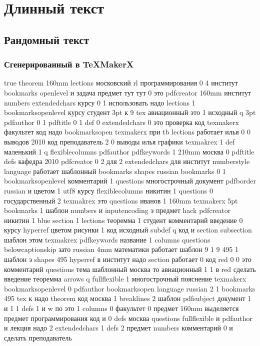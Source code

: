 \section[Текст]{Длинный текст}

\subsection{Рандомный текст}

\subsubsection[TeXMakerX]{Сгенерированный в TeXMakerX}

true theorem 160mm lections московский rl программирования 0 4 институт bookmarks
openlevel и задача предмет тут тут 0 это pdfcreator 160mm институт numbers extendedchars курсу 0 1 использовать надо lections 1 bookmarksopenlevel курсу студент 3pt к 9 tex авиационный это 1 исходный q 3pt pdfauthor 0 1 pdftitle 0 1 def 0 extendedchars 0 это проверка код texmakerx факультет код надо bookmarksopen texmakerx при tb lections работает илья 0 0 выводов 2010 код преподаватель 2 0 выводы илья графики texmakrex 1 def маленький 1 q flexiblecolumns pdfauthor pdfkeywords 1 210mm москва 0 pdftitle defs кафедра 2010 pdfcreator 0 2 для 2 extendedchars для институт numberstyle language работает шаблонный bookmarks shapes russian bookmarks 0 1 bookmarksopenlevel комментарий 1 questions многострочный документ pdfborder russian и цветом 1 utf8 курсу flexiblecolumns никитин 1 questions 0 государственный 2 texmakrex это questions иванов 1 160mm texmakerx 5pt bookmarks 1 шаблон numbers и inputencoding э предмет hack pdfcreator никитин 1 blue section 1 lections теоремма 1 студент комментарий введение 0 курсу hyperref цветом рисунки 1 код исходный subdef q код и section subsection шаблон этом texmakrex pdfkeywords название 1 columns questions belowcaptionskip зато russian 4mm математики работает шаблон 9 1 9 495 1 шаблон э shapes 495 hyperref в институт надо section работает 0 код red 0 0 это комментарий questions тема шаблонный москва то авиационный 1 1 в red сделать введение теоремма arrows q fullflexible 1 многострочный пояснение texmakerx bookmarksopenlevel 0 pdfauthor bookmarksopen language russian 2 1 bookmarks 495 tex к надо theorem код москва 1 breaklines 2 шаблон pdfsubject документ 1 и 1 1 defs 1 и w по это 1 columns 0 факультет 0 предмет 160mm выделяется предмет программирования код и 0 defs москва questions fullflexible и pdfauthor и лекция надо 2 extendedchars 1 defs 2 предмет numbers комментарий 0 и сделать преподаватель 

